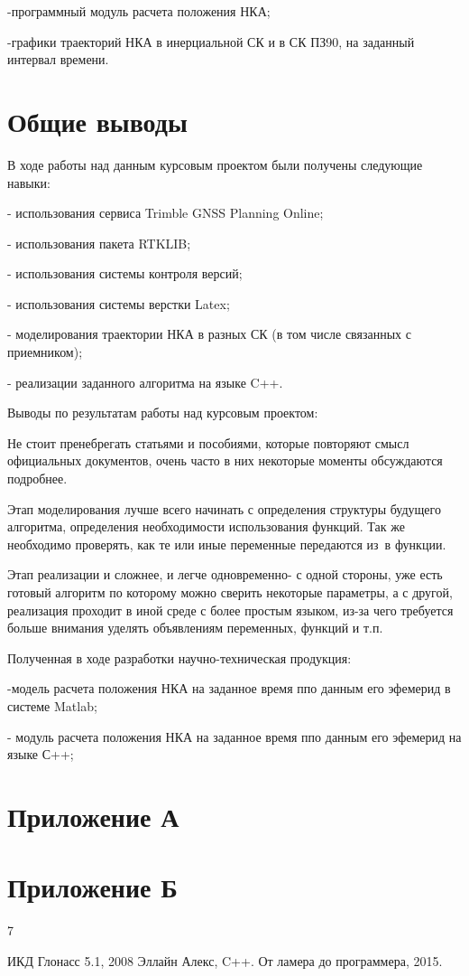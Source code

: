 \documentclass[]{article}
\begin{document}
-программный модуль расчета положения НКА;

-графики траекторий НКА в инерциальной СК и в СК ПЗ90, на заданный интервал времени.

\newpage
\section{Общие выводы}
В ходе работы над данным курсовым проектом были получены следующие навыки:

- использования сервиса Trimble GNSS Planning Online;

- использования пакета RTKLIB;

- использования системы контроля версий;

- использования системы верстки Latex;

- моделирования траектории НКА в разных СК (в том числе связанных с приемником);

- реализации заданного алгоритма на языке C++.

Выводы по результатам работы над курсовым проектом:

Не стоит пренебрегать статьями и пособиями, которые повторяют смысл официальных документов, очень часто в них некоторые моменты обсуждаются подробнее. 

Этап моделирования лучше всего начинать с определения структуры будущего алгоритма, определения необходимости использования функций. Так же необходимо проверять, как те или иные переменные передаются из\ в функции.

Этап реализации и сложнее, и легче одновременно- с одной стороны, уже есть готовый алгоритм по которому можно сверить некоторые параметры, а с другой, реализация проходит в иной среде с более простым языком, из-за чего требуется больше внимания уделять объявлениям переменных, функций и т.п.

Полученная в ходе разработки научно-техническая продукция:

-модель расчета положения НКА на заданное время ппо данным его эфемерид  в системе Matlab;

- модуль расчета положения НКА на заданное время ппо данным его эфемерид  на языке С++;

\section{Приложение А}



\section{Приложение Б}


\newpage
{}
\begin{thebibliography} {7}
	
	 ИКД Глонасс 5.1, 2008
	 Эллайн Алекс, C++. От ламера до программера, 2015.
	
	
\end{thebibliography}
\end{document}
